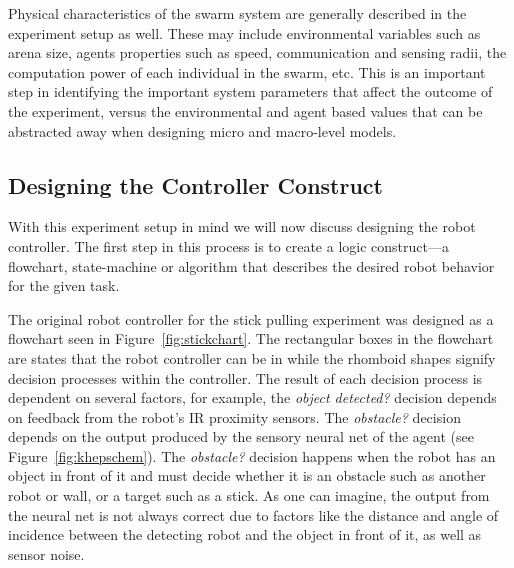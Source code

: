 \documentclass[Main.tex]{subfiles}
\begin{document}
Physical characteristics of the swarm system are generally described in the experiment setup as well. These may include environmental variables such as arena size, agents properties such as speed, communication and sensing radii, the computation power of each individual in the swarm, etc. This is an important step in identifying the important system parameters that affect the outcome of the experiment, versus the environmental and agent based values that can be abstracted away when designing micro and macro-level models.
 

\subsection{Designing the Controller Construct}
With this experiment setup in mind we will now discuss designing the robot controller. The first step in this process is to create a logic construct---a flowchart, state-machine or algorithm that describes the desired robot behavior for the given task.

The original robot controller for the stick pulling experiment was designed as a flowchart seen in Figure~\ref{fig:stickchart}. The rectangular boxes in the flowchart are states that the robot controller can be in while the rhomboid shapes signify decision processes within the controller. The result of each decision process is dependent on several factors, for example, the \emph{object detected?} decision depends on feedback from the robot's IR proximity sensors. The \emph{obstacle?} decision depends on the output produced by the sensory neural net of the agent (see Figure~\ref{fig:khepschem}). The \emph{obstacle?} decision happens when the robot has an object in front of it and must decide whether it is an obstacle such as another robot or wall, or a target such as a stick. As one can imagine, the output from the neural net is not always correct due to factors like the distance and angle of incidence between the detecting robot and the object in front of it, as well as sensor noise.
\end{document}
